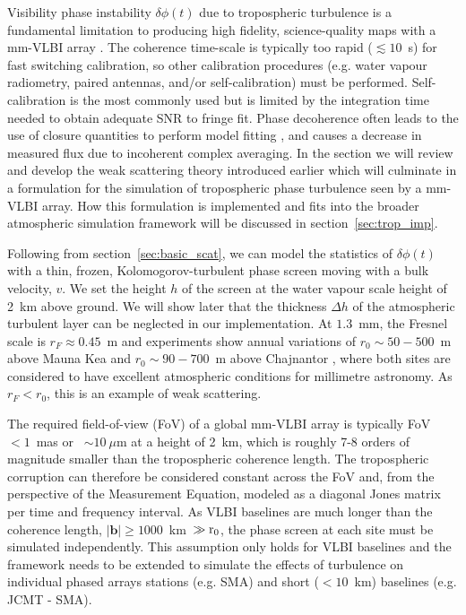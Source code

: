 Visibility phase instability  $\delta \phi(t)$ due to tropospheric turbulence is a fundamental limitation to producing high fidelity, science-quality maps with a mm-VLBI array \citep{Thompson_2001}. The coherence time-scale is typically too rapid ($\lesssim10$~s) for fast switching calibration, so other calibration procedures (e.g. water vapour radiometry, paired antennas, and/or self-calibration) must be performed. Self-calibration is the most commonly used but is limited by the integration time needed to obtain adequate SNR to fringe fit. Phase decoherence often leads to the use of closure quantities to perform model fitting \citep{Doeleman_2001,Bower_2004, Shen_2005}, and causes a decrease in measured flux due to incoherent complex averaging.
In the section we will review and develop the weak scattering theory introduced earlier which will culminate in a formulation for the simulation of tropospheric phase turbulence seen by a mm-VLBI array. How this formulation is implemented and fits into the broader atmospheric simulation framework will be discussed in section~\ref{sec:trop_imp}. 


Following from section~\ref{sec:basic_scat}, we can model the statistics of $\delta \phi(t)$ with a thin, frozen, Kolomogorov-turbulent phase screen moving with a bulk velocity, $v$.  We set the height $h$ of the screen at the water vapour scale height of 2~km above ground. We will show later that the thickness $\Delta h$ of the atmospheric turbulent layer can be neglected in our implementation. At $1.3$~mm, the Fresnel scale is $r_F \approx 0.45$~m and experiments show annual variations of $r_0 \sim 50 - 500$~m above Mauna Kea \citep{Masson_1994} and $r_0 \sim 90 - 700$~m above Chajnantor \citep*{Radford_1998}, where both sites are considered to have excellent atmospheric conditions for millimetre astronomy. As $r_F < r_0$, this is an example of weak scattering. 


The required field-of-view (FoV) of a global mm-VLBI array is typically FoV~$< 1$~mas or ~$\sim10~\mu$m at a height of 2~km, which is roughly 7-8 orders of magnitude smaller than the tropospheric coherence length. The tropospheric corruption can therefore be considered constant across the FoV and, from the perspective of the Measurement Equation, modeled as a diagonal Jones matrix per time and frequency interval. As VLBI baselines are much longer than the coherence length, $|\mathbf{b}| \ge 1000$~km~$\gg \rm r_0$, the phase screen at each site must be simulated independently. This assumption only holds for VLBI baselines and the framework needs to be extended to simulate the effects of turbulence on individual phased arrays stations (e.g. SMA) and short ($<10$~km) baselines (e.g. JCMT - SMA). 


